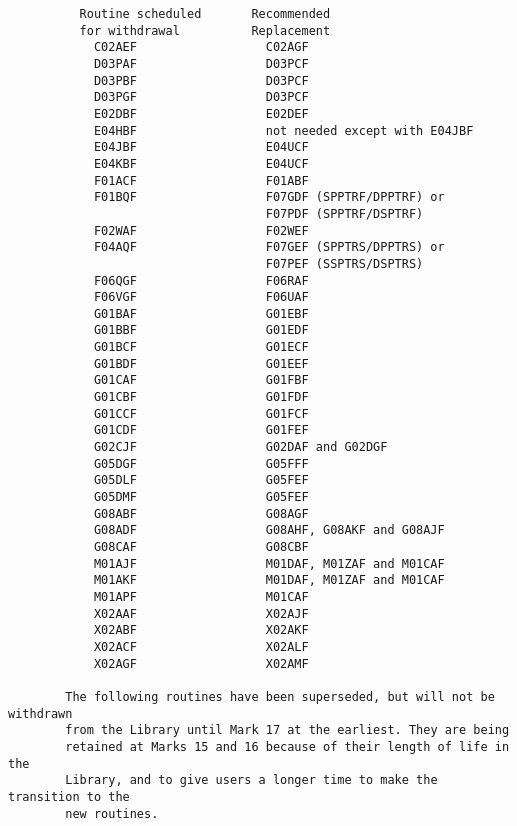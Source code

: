\begin{small}
\begin{verbatim}
          Routine scheduled       Recommended
          for withdrawal          Replacement
            C02AEF                  C02AGF
            D03PAF                  D03PCF
            D03PBF                  D03PCF
            D03PGF                  D03PCF
            E02DBF                  E02DEF
            E04HBF                  not needed except with E04JBF
            E04JBF                  E04UCF
            E04KBF                  E04UCF
            F01ACF                  F01ABF
            F01BQF                  F07GDF (SPPTRF/DPPTRF) or
                                    F07PDF (SPPTRF/DSPTRF)
            F02WAF                  F02WEF
            F04AQF                  F07GEF (SPPTRS/DPPTRS) or
                                    F07PEF (SSPTRS/DSPTRS)
            F06QGF                  F06RAF
            F06VGF                  F06UAF
            G01BAF                  G01EBF
            G01BBF                  G01EDF
            G01BCF                  G01ECF
            G01BDF                  G01EEF
            G01CAF                  G01FBF
            G01CBF                  G01FDF
            G01CCF                  G01FCF
            G01CDF                  G01FEF
            G02CJF                  G02DAF and G02DGF
            G05DGF                  G05FFF
            G05DLF                  G05FEF
            G05DMF                  G05FEF
            G08ABF                  G08AGF
            G08ADF                  G08AHF, G08AKF and G08AJF
            G08CAF                  G08CBF
            M01AJF                  M01DAF, M01ZAF and M01CAF
            M01AKF                  M01DAF, M01ZAF and M01CAF
            M01APF                  M01CAF
            X02AAF                  X02AJF
            X02ABF                  X02AKF
            X02ACF                  X02ALF
            X02AGF                  X02AMF

        The following routines have been superseded, but will not be withdrawn
        from the Library until Mark 17 at the earliest. They are being
        retained at Marks 15 and 16 because of their length of life in the
        Library, and to give users a longer time to make the transition to the
        new routines.


\end{verbatim}
\end{small}

